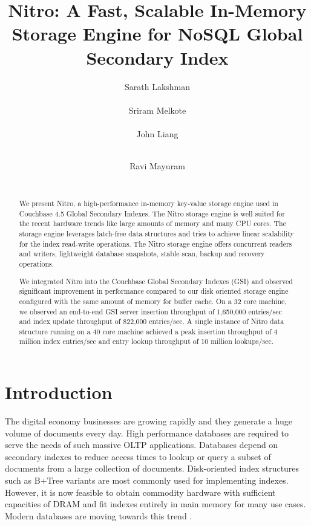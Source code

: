 \documentclass{vldb}
\begin{document}
\title{Nitro: A Fast, Scalable In-Memory Storage Engine for NoSQL Global Secondary Index}

\author{
\alignauthor
Sarath Lakshman\\
       \\
\alignauthor
Sriram Melkote\\
       \\
\alignauthor
John Liang\\
       \\
\and
\alignauthor
Ravi Mayuram\\
       \\
}

\maketitle

\begin{abstract}
We present Nitro, a high-performance in-memory key-value storage engine used in Couchbase 4.5 Global Secondary Indexes. The Nitro storage engine is well suited for the recent hardware trends like large amounts of memory and many CPU cores. The storage engine leverages latch-free data structures and tries to achieve linear scalability for the index read-write operations. The Nitro storage engine offers concurrent readers and writers, lightweight database snapshots, stable scan, backup and recovery operations.

We integrated Nitro into the Couchbase Global Secondary Indexes (GSI) and observed significant improvement in performance compared to our disk oriented storage engine configured with the same amount of memory for buffer cache. On a 32 core machine, we observed an end-to-end GSI server insertion throughput of 1,650,000 entries/sec and index update throughput of 822,000 entries/sec. A single instance of Nitro data structure running on a 40 core machine achieved a peak insertion throughput of 4 million index entries/sec and entry lookup throughput of 10 million lookups/sec.
\end{abstract}

\section{Introduction}
The digital economy businesses are growing rapidly and they generate a huge volume of documents every day. High performance databases are required to serve the needs of such massive OLTP applications. Databases depend on secondary indexes to reduce access times to lookup or query a subset of documents from a large collection of documents. Disk-oriented index structures such as B+Tree variants are most commonly used for implementing indexes. However, it is now feasible to obtain commodity hardware with sufficient capacities of DRAM and fit indexes entirely in main memory for many use cases. Modern databases are moving towards this trend  \cite{couchbase,voltdb,memsql}.
\end{document}
